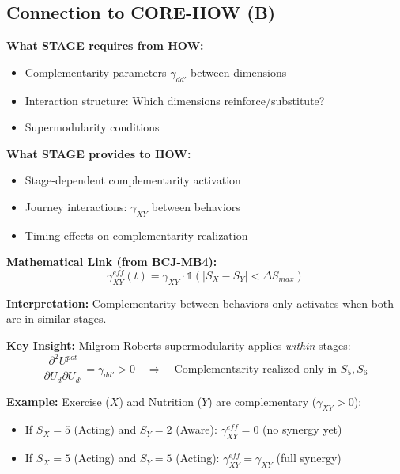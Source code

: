 \subsection{Connection to CORE-HOW (B)}

\begin{tcolorbox}[colback=blue!5!white, colframe=blue!75!black,
    title=Integration: STAGE $\leftrightarrow$ HOW]

\textbf{What STAGE requires from HOW:}
\begin{itemize}[nosep]
\item Complementarity parameters $\gamma_{dd'}$ between dimensions
\item Interaction structure: Which dimensions reinforce/substitute?
\item Supermodularity conditions
\end{itemize}

\textbf{What STAGE provides to HOW:}
\begin{itemize}[nosep]
\item Stage-dependent complementarity activation
\item Journey interactions: $\gamma_{XY}$ between behaviors
\item Timing effects on complementarity realization
\end{itemize}

\textbf{Mathematical Link (from BCJ-MB4):}
\begin{equation}
\gamma_{XY}^{eff}(t) = \gamma_{XY} \cdot \mathbb{1}(|S_X - S_Y| < \Delta S_{max})
\end{equation}

\textbf{Interpretation:} Complementarity between behaviors only activates when both are in similar stages.

\textbf{Key Insight:} Milgrom-Roberts supermodularity applies \textit{within} stages:
\begin{equation}
\frac{\partial^2 U^{pot}}{\partial U_d \partial U_{d'}} = \gamma_{dd'} > 0 \quad \Rightarrow \quad \text{Complementarity realized only in } S_5, S_6
\end{equation}

\textbf{Example:} Exercise ($X$) and Nutrition ($Y$) are complementary ($\gamma_{XY} > 0$):
\begin{itemize}[nosep]
\item If $S_X = 5$ (Acting) and $S_Y = 2$ (Aware): $\gamma_{XY}^{eff} = 0$ (no synergy yet)
\item If $S_X = 5$ (Acting) and $S_Y = 5$ (Acting): $\gamma_{XY}^{eff} = \gamma_{XY}$ (full synergy)
\end{itemize}
\end{tcolorbox}

